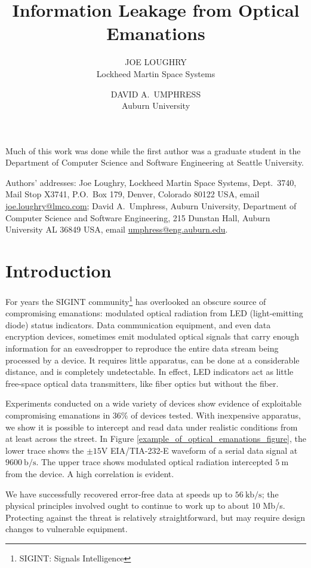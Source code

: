 \documentclass{acmtrans2e}
\title{Information Leakage from Optical Emanations}
\author{JOE LOUGHRY \\ Lockheed Martin Space Systems
\and DAVID A.\ UMPHRESS \\ Auburn University}
\begin{document}
\begin{bottomstuff}

Much of this work was done while the first author was a graduate student
in the Department of Computer Science and Software Engineering at Seattle
University.

Authors' addresses: Joe Loughry, Lockheed Martin Space Systems,
Dept.\ 3740, Mail Stop X3741,
P.O.\ Box 179, Denver, Colorado 80122 USA, email \url{joe.loughry@lmco.com};
David A.\ Umphress, Auburn University, Department of Computer Science and
Software Engineering, 215 Dunstan Hall, Auburn University AL 36849 USA,
email \url{umphress@eng.auburn.edu}.

\permission
\end{bottomstuff}

\maketitle

\section{Introduction}

For years the SIGINT community\footnote{SIGINT: Signals Intelligence}
has overlooked an obscure source of compromising emanations: modulated 
optical radiation from LED (light-emitting diode) status indicators.  
Data communication equipment, and even data encryption devices, 
sometimes emit modulated optical signals that carry enough information 
for an eavesdropper to reproduce the entire data stream being processed 
by a device.  It requires little 
apparatus, can be done at a considerable distance, and is completely 
undetectable.  In effect, LED indicators act as little free-space 
optical data transmitters, like fiber optics but without the fiber.

Experiments conducted on a wide variety of devices show evidence of 
exploitable compromising emanations in 36\% of devices tested.  With 
inexpensive apparatus, we show it is possible to intercept and read data 
under realistic conditions from at least across the street.  In Figure 
\ref{example_of_optical_emanations_figure}, the lower trace shows the
$\pm15$V EIA/TIA-232-E waveform of a serial data signal at
$9600\ \mathrm{b}/\mathrm{s}$. 
The upper trace shows modulated optical radiation intercepted
$5\ \mathrm{m}$ from the device.  A high correlation is evident.

We have successfully recovered error-free data at
speeds up to $56\ \mathrm{kb}/\mathrm{s}$; the physical principles
involved ought to
continue to work up to about 10 Mb/s.  Protecting against the 
threat is relatively straightforward, but may require design
changes to vulnerable equipment.
\end{document}
